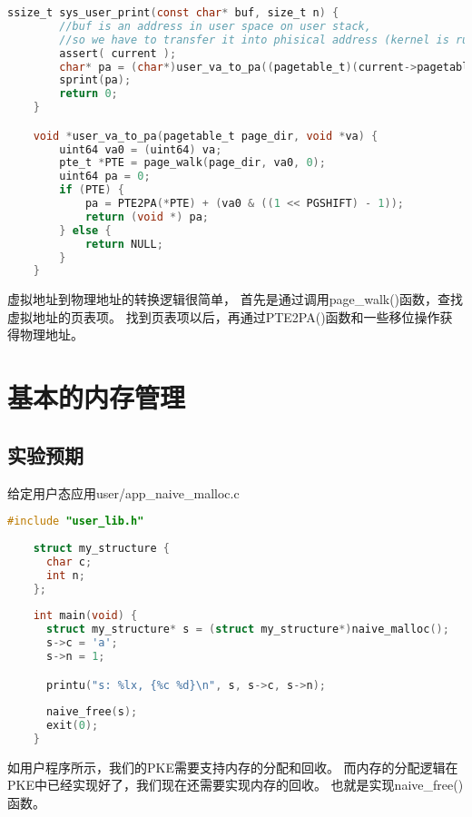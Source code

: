 \begin{lstlisting}[caption={虚拟地址到物理地址的转换}, label={lst:app_virt_to_phys}, language=C]
    ssize_t sys_user_print(const char* buf, size_t n) {
        //buf is an address in user space on user stack,
        //so we have to transfer it into phisical address (kernel is running in direct mapping).
        assert( current );
        char* pa = (char*)user_va_to_pa((pagetable_t)(current->pagetable), (void*)buf);
        sprint(pa);
        return 0;
    }    

    void *user_va_to_pa(pagetable_t page_dir, void *va) {
        uint64 va0 = (uint64) va;
        pte_t *PTE = page_walk(page_dir, va0, 0);
        uint64 pa = 0;
        if (PTE) {
            pa = PTE2PA(*PTE) + (va0 & ((1 << PGSHIFT) - 1));
            return (void *) pa;
        } else {
            return NULL;
        }
    }    
\end{lstlisting}

虚拟地址到物理地址的转换逻辑很简单，
首先是通过调用page\_walk()函数，查找虚拟地址的页表项。
找到页表项以后，再通过PTE2PA()函数和一些移位操作获得物理地址。

\section{基本的内存管理}

\subsection{实验预期}

给定用户态应用user/app\_naive\_malloc.c

\begin{lstlisting}[caption={用户态应用app\_naive\_malloc.c}, label={lst:app_naive_malloc}, language=C]
    #include "user_lib.h"
    
    struct my_structure {
      char c;
      int n;
    };
    
    int main(void) {
      struct my_structure* s = (struct my_structure*)naive_malloc();
      s->c = 'a';
      s->n = 1;

      printu("s: %lx, {%c %d}\n", s, s->c, s->n);
    
      naive_free(s);
      exit(0);
    }   
\end{lstlisting}

如用户程序所示，我们的PKE需要支持内存的分配和回收。
而内存的分配逻辑在PKE中已经实现好了，我们现在还需要实现内存的回收。
也就是实现naive\_free()函数。


